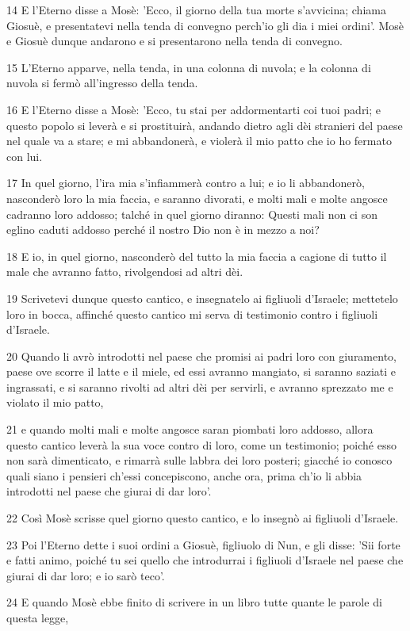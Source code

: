 \par 14 E l'Eterno disse a Mosè: 'Ecco, il giorno della tua morte s'avvicina; chiama Giosuè, e presentatevi nella tenda di convegno perch'io gli dia i miei ordini'. Mosè e Giosuè dunque andarono e si presentarono nella tenda di convegno.
\par 15 L'Eterno apparve, nella tenda, in una colonna di nuvola; e la colonna di nuvola si fermò all'ingresso della tenda.
\par 16 E l'Eterno disse a Mosè: 'Ecco, tu stai per addormentarti coi tuoi padri; e questo popolo si leverà e si prostituirà, andando dietro agli dèi stranieri del paese nel quale va a stare; e mi abbandonerà, e violerà il mio patto che io ho fermato con lui.
\par 17 In quel giorno, l'ira mia s'infiammerà contro a lui; e io li abbandonerò, nasconderò loro la mia faccia, e saranno divorati, e molti mali e molte angosce cadranno loro addosso; talché in quel giorno diranno: Questi mali non ci son eglino caduti addosso perché il nostro Dio non è in mezzo a noi?
\par 18 E io, in quel giorno, nasconderò del tutto la mia faccia a cagione di tutto il male che avranno fatto, rivolgendosi ad altri dèi.
\par 19 Scrivetevi dunque questo cantico, e insegnatelo ai figliuoli d'Israele; mettetelo loro in bocca, affinché questo cantico mi serva di testimonio contro i figliuoli d'Israele.
\par 20 Quando li avrò introdotti nel paese che promisi ai padri loro con giuramento, paese ove scorre il latte e il miele, ed essi avranno mangiato, si saranno saziati e ingrassati, e si saranno rivolti ad altri dèi per servirli, e avranno sprezzato me e violato il mio patto,
\par 21 e quando molti mali e molte angosce saran piombati loro addosso, allora questo cantico leverà la sua voce contro di loro, come un testimonio; poiché esso non sarà dimenticato, e rimarrà sulle labbra dei loro posteri; giacché io conosco quali siano i pensieri ch'essi concepiscono, anche ora, prima ch'io li abbia introdotti nel paese che giurai di dar loro'.
\par 22 Così Mosè scrisse quel giorno questo cantico, e lo insegnò ai figliuoli d'Israele.
\par 23 Poi l'Eterno dette i suoi ordini a Giosuè, figliuolo di Nun, e gli disse: 'Sii forte e fatti animo, poiché tu sei quello che introdurrai i figliuoli d'Israele nel paese che giurai di dar loro; e io sarò teco'.
\par 24 E quando Mosè ebbe finito di scrivere in un libro tutte quante le parole di questa legge,
